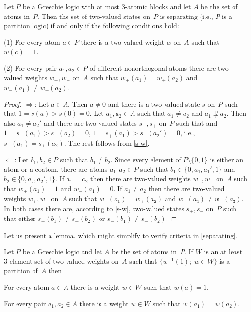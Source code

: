 \begin {proposition} \label {separating}
Let $P$ be a Greechie logic with at most 3-atomic blocks and let $A$ be the
set of atoms in~$P$. Then the set of two-valued states on~$P$ is separating
(i.e., $P$ is a partition logic) if and only if the following conditions
hold:

{\rm(1)} For every atom $a \in P$ there is a two-valued weight $w$ on~$A$
such that $w(a)=1$.

{\rm(2)} For every pair $a_1,a_2 \in P$ of different nonorthogonal atoms
there are two-valued weights $w_+,w_-$ on~$A$ such that $w_+(a_1) = w_+(a_2)$
and $w_-(a_1) \neq w_-(a_2)$.
\end {proposition}


\begin {proof}
$\Rightarrow$: Let $a \in A$. Then $a \neq 0$ and there is a two-valued state
$s$ on~$P$ such that $1=s(a) > s(0)=0$. Let $a_1,a_2 \in A$ such that $a_1
\neq a_2$ and $a_1 \not\perp a_2$. Then also $a_1 \neq a_2'$ and there are
two-valued states $s_-,s_+$ on~$P$ such that and $1=s_-(a_1) > s_-(a_2)=0$,
$1=s_+(a_1) > s_+(a_2')=0$, i.e., $s_+(a_1)=s_+(a_2)$. The rest follows from
\ref{s-w}.

$\Leftarrow$: Let $b_1,b_2 \in P$ such that $b_1 \neq b_2$. Since every
element of $P\setminus \{0,1\}$ is either an atom or a coatom, there are
atoms $a_1,a_2 \in P$ such that $b_1 \in \{0,a_1,a_1',1\}$ and $b_2 \in
\{0,a_2,a_2',1\}$. If $a_1=a_2$ then there are two-valued weights $w_+,w_-$
on~$A$ such that $w_+(a_1)=1$ and $w_-(a_1)=0$. If $a_1 \neq a_2$ then there
are two-valued weights $w_+,w_-$ on~$A$ such that $w_+(a_1) = w_+(a_2)$ and
$w_-(a_1) \neq w_-(a_2)$. In both cases there are, according to
\ref{s-w}, two-valued states $s_+,s_-$ on~$P$ such that either
$s_+(b_1) \neq s_+(b_2)$ or $s_-(b_1) \neq s_-(b_2)$.
\end {proof}


Let us present a lemma, which might simplify to verify criteria in
\ref{separating}.


\begin {lemma} \label {partition}
Let $P$ be a Greechie logic and let $A$ be the set of atoms in~$P$. If $W$
is an at least 3-element set of two-valued weights on~$A$ such that
$\{w^{-1}(1);\; w \in W\}$ is a partition of~$A$ then
  \begin {conditions}
  \item
  For every atom $a \in A$ there is a weight $w \in W$ such that $w(a)=1$.
  \item
  For every pair $a_1,a_2 \in A$ there is a weight $w \in W$ such that
  $w(a_1) = w(a_2)$.
  \end {conditions}
\end {lemma}


